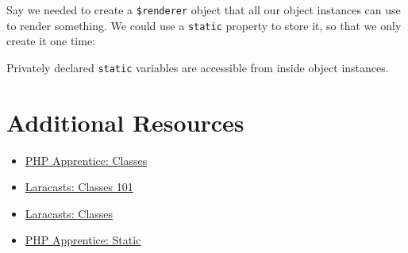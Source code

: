Say we needed to create a \texttt{\$renderer} object that all our object instances can use to render\textellipsis{} something. We could use a \texttt{static} property to store it, so that we only create it one time:


Privately declared \texttt{static} variables are accessible from inside object instances.


\section{Additional Resources}

\begin{itemize}[leftmargin=*]
    \item \href{https://phpapprentice.com/classes.html}{PHP Apprentice: Classes}
    \item \href{https://laracasts.com/series/php-for-beginners/episodes/12}{Laracasts: Classes 101}
    \item \href{https://laracasts.com/series/object-oriented-bootcamp-in-php/episodes/1}{Laracasts: Classes}
    \item \href{https://phpapprentice.com/static.html}{PHP Apprentice: Static}
\end{itemize}
